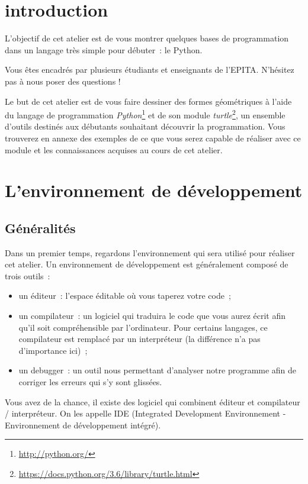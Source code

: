 \documentclass[11pt,a4paper]{article}
\begin{document}

\section{introduction}
L'objectif de cet atelier est de vous montrer quelques bases de
programmation dans un langage très simple pour débuter~: le Python.

Vous êtes encadrés par plusieurs étudiants et enseignants de l'EPITA. N'hésitez
pas à nous poser des questions !

Le but de cet atelier est de vous faire dessiner des formes géométriques
à l'aide du langage de programmation
\emph{Python}\footnote{\url{http://python.org/}} et de son module
\emph{turtle}\footnote{\url{https://docs.python.org/3.6/library/turtle.html}},
un ensemble d'outils destinés aux débutants souhaitant découvrir la
programmation.  Vous trouverez en annexe des exemples de ce que vous serez
capable de réaliser avec ce module et les connaissances acquises au cours de cet
atelier.

\section{L'environnement de développement}
\subsection{Généralités}

Dans un premier temps, regardons l'environnement qui sera utilisé pour réaliser
cet atelier. Un environnement de développement est généralement composé de trois
outils~:

\begin{itemize}
    \item un éditeur~: l'espace éditable où vous taperez votre code~;
    \item un compilateur~: un logiciel qui traduira le code que vous aurez
        écrit afin qu'il soit compréhensible par l'ordinateur. Pour certains
        langages, ce compilateur est remplacé par un interpréteur (la différence
        n'a pas d'importance ici)~;
    \item un debugger~: un outil nous permettant d'analyser notre programme afin
        de corriger les erreurs qui s'y sont glissées.
\end{itemize}

Vous avez de la chance, il existe des logiciel qui combinent éditeur et
compilateur / interpréteur. On les appelle IDE (Integrated Development
Environnement - Environnement de développement intégré).
\end{document}
